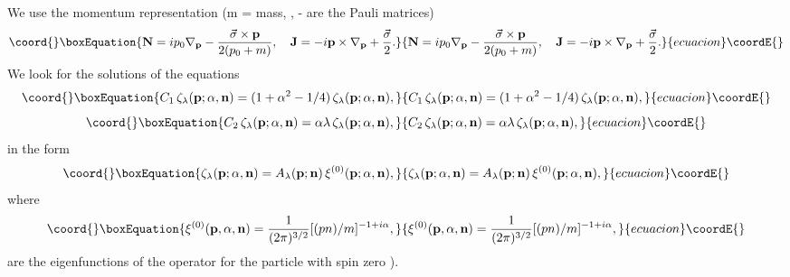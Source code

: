 \documentclass[a4paper,12pt]{article}
\begin{document}
We use the momentum representation  (m = mass, \coordHE{},  \myHighlight{${\vec \sigma}$}\coordHE{} - are the Pauli matrices)
\begin{equation}\coord{}\boxEquation{
\label{7}
{\bf N}=ip_0{\nabla}_{\bf p}-\frac{{\vec \sigma}\times{\bf p}}
{2(p_0+m)},\quad{\bf J}=-i{\bf p}\times{\bf \nabla}_{\bf p}
+\frac{\vec \sigma}{2}.                    
}{
{\bf N}=ip_0{\nabla}_{\bf p}-\frac{{\vec \sigma}\times{\bf p}}
{2(p_0+m)},\quad{\bf J}=-i{\bf p}\times{\bf \nabla}_{\bf p}
+\frac{\vec \sigma}{2}.                    
}{ecuacion}\coordE{}\end{equation}
We look for the solutions of the equations 
\begin{equation}\coord{}\boxEquation{
\label{8}
C_1\,\zeta_{\lambda}({\bf p};{\alpha},{\bf n})= (1+\alpha^2-1/4)\,\zeta_{\lambda}({\bf p};{\alpha},{\bf n}),
}{
C_1\,\zeta_{\lambda}({\bf p};{\alpha},{\bf n})= (1+\alpha^2-1/4)\,\zeta_{\lambda}({\bf p};{\alpha},{\bf n}),
}{ecuacion}\coordE{}\end{equation}
\begin{equation}\coord{}\boxEquation{
\label{9}
C_2\,\zeta_{\lambda}({\bf p};{\alpha},{\bf n})={\alpha}{\lambda}\,\zeta_{\lambda}({\bf p};{\alpha},{\bf n}),
}{
C_2\,\zeta_{\lambda}({\bf p};{\alpha},{\bf n})={\alpha}{\lambda}\,\zeta_{\lambda}({\bf p};{\alpha},{\bf n}),
}{ecuacion}\coordE{}\end{equation}
in the form 
\begin{equation}\coord{}\boxEquation{
\label{10}
\zeta_{\lambda}({\bf p};{\alpha},{\bf n})=A_{\lambda}({\bf p};{\bf n})\,\xi^{(0)}({\bf p};{\alpha},{\bf n}),
}{
\zeta_{\lambda}({\bf p};{\alpha},{\bf n})=A_{\lambda}({\bf p};{\bf n})\,\xi^{(0)}({\bf p};{\alpha},{\bf n}),
}{ecuacion}\coordE{}\end{equation}
where \coordHE{}
\begin{equation}\coord{}\boxEquation{
\label{11}
\xi^{(0)}({\bf p},{\alpha},{\bf n})=\frac{1}{(2\pi)^{3/2}}[(pn)/m]^{-1+i\alpha},
}{
\xi^{(0)}({\bf p},{\alpha},{\bf n})=\frac{1}{(2\pi)^{3/2}}[(pn)/m]^{-1+i\alpha},
}{ecuacion}\coordE{}\end{equation}
are the  eigenfunctions of the operator \coordHE{} for the particle with spin zero   \cite{Shapiro,Kad,Ska}).
\end{document}
